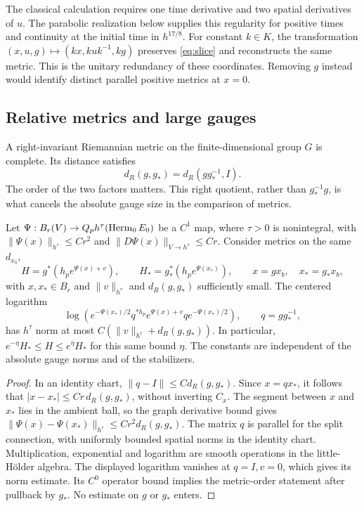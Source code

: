 The classical calculation requires one time derivative and two
spatial derivatives of $u$. The parabolic realization below
supplies this regularity for positive times and continuity at
the initial time in $h^{17/8}$.
For constant $k\in K$, the transformation
$(x,u,g)\mapsto(kx,kuk^{-1},kg)$ preserves \eqref{eq:slice}
and reconstructs the same metric. This is the unitary redundancy
of these coordinates. Removing $g$ instead would identify
distinct parallel positive metrics at $x=0$.

\subsection{Relative metrics and large gauges}
A right-invariant Riemannian metric on the finite-dimensional
group $G$ is complete. Its distance satisfies
\[
 d_R(g,g_*)=d_R(gg_*^{-1},I).
\]
The order of the two factors matters. This right quotient,
rather than $g_*^{-1}g$, is what cancels the absolute gauge
size in the comparison of metrics.

\begin{lemma}\label{lem:relative}
Let $\Psi:B_r(V)\to Q_ph^\tau(\operatorname{Herm}_0E_0)$ be a $C^1$ map,
where $\tau>0$ is nonintegral, with
$\|\Psi(x)\|_{h^\tau}\le Cr^2$ and
$\|D\Psi(x)\|_{V\to h^\tau}\le Cr$.
Consider metrics on the same $d_{x_b}$,
\[
 H=g^*(h_pe^{\Psi(x)+v}),\qquad
 H_*=g_*^*(h_pe^{\Psi(x_*)}),\qquad x=gx_b,\quad x_*=g_*x_b,
\]
with $x,x_*\in B_r$ and $\|v\|_{h^\tau}$ and $d_R(g,g_*)$
sufficiently small. The centered logarithm
\[
 \log\!\left(e^{-\Psi(x_*)/2}q^{*h_p}
             e^{\Psi(x)+v}q e^{-\Psi(x_*)/2}\right),
 \qquad q=gg_*^{-1},
\]
has $h^\tau$ norm at most
$C(\|v\|_{h^\tau}+d_R(g,g_*))$. In particular,
$e^{-\eta}H_*\le H\le e^\eta H_*$ for this same bound $\eta$.
The constants are independent of the absolute gauge norms
and of the stabilizers.
\end{lemma}

\begin{proof}
In an identity chart, $\|q-I\|\le C d_R(g,g_*)$.
Since $x=qx_*$, it follows that
$|x-x_*|\le Cr\,d_R(g,g_*)$, without inverting $C_x$.
The segment between $x$ and $x_*$ lies in the ambient ball,
so the graph derivative bound gives
$\|\Psi(x)-\Psi(x_*)\|_{h^\tau}\le Cr^2d_R(g,g_*)$.
The matrix $q$ is parallel for the split connection, with
uniformly bounded spatial norms in the identity chart.
Multiplication, exponential and logarithm are smooth operations
in the little-H\"older algebra. The displayed logarithm vanishes
at $q=I,v=0$, which gives its norm estimate. Its $C^0$
operator bound implies the metric-order statement after
pullback by $g_*$. No estimate on $g$ or $g_*$ enters.
\end{proof}
